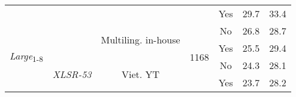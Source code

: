 \begin{table}[!ht]
\begin{adjustbox}{width=0.7\columnwidth,center}
\begin{tabular}{|c|c|c|c|c|c|c|}
\cline{5-7}
                                   &                                    &                                      &                       & Yes                       & 29.7       & 33.4              \\ 
\cline{1-1}\cline{3-7}
\multirow{4}{*}{\textit{Large}\textsubscript{1-8}} &                                    & \multirow{2}{*}{Multiling. in-house} & \multirow{4}{*}{1168} & No                        & 26.8       & 28.7              \\ 
\cline{5-7}
                                   &                                    &                                      &                       & Yes                       & 25.5       & 29.4              \\ 
\cline{2-3}\cline{5-7}
                                   & \multirow{2}{*}{\textit{XLSR-53}}  & \multirow{2}{*}{Viet. YT}            &                       & No                        & 24.3       & 28.1              \\ 
\cline{5-7}
                                   &                                    &                                      &                       & Yes                       & 23.7       & 28.2              \\
\hline
\end{tabular}
\end{adjustbox}
\caption{
    }
\label{table:int_loss_hykist_neg}
\end{table}